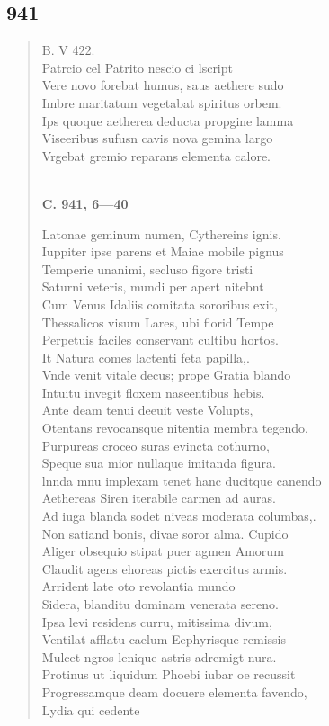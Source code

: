\documentclass[11pt, a4paper]{report}
\begin{document}
            \subsection*{941}
      \begin{verse}
      B. V 422. \\ Patrcio cel Patrito nescio ci lscript \\ Vere novo forebat humus, saus aethere sudo \\ Imbre maritatum vegetabat spiritus orbem. \\ Ips quoque aetherea deducta propgine lamma \\ Viseeribus sufusn cavis nova gemina largo \\ Vrgebat gremio reparans elementa calore. \\ 
        ﻿\pagebreak 
    \begin{center} \textbf{C. 941, 6—40} \end{center} \marginpar{[362]} Latonae geminum numen, Cythereins ignis. \\ Iuppiter ipse parens et Maiae mobile pignus \\ Temperie unanimi, secluso figore tristi \\ Saturni veteris, mundi per apert nitebnt \\ Cum Venus Idaliis comitata sororibus exit, \\ Thessalicos visum Lares, ubi florid Tempe \\ Perpetuis faciles conservant cultibu hortos. \\ It Natura comes lactenti feta papilla,. \\ Vnde venit vitale decus; prope Gratia blando \\ Intuitu invegit floxem naseentibus hebis. \\ Ante deam tenui deeuit veste Volupts, \\ Otentans revocansque nitentia membra tegendo, \\ Purpureas croceo suras evincta cothurno, \\ Speque sua mior nullaque imitanda figura. \\ lnnda mnu implexam tenet hanc ducitque canendo \\ Aethereas Siren iterabile carmen ad auras. \\ Ad iuga blanda sodet niveas moderata columbas,. \\ Non satiand bonis, divae soror alma. Cupido \\ Aliger obsequio stipat puer agmen Amorum \\ Claudit agens ehoreas pictis exercitus armis. \\ Arrident late oto revolantia mundo \\ Sidera, blanditu dominam venerata sereno. \\ Ipsa levi residens curru, mitissima divum, \\ Ventilat afflatu caelum Eephyrisque remissis \\ Mulcet ngros lenique astris adremigt nura. \\ Protinus ut liquidum Phoebi iubar oe recussit \\ Progressamque deam docuere elementa favendo, \\ Lydia qui cedente 
\end{verse}
\end{document}
